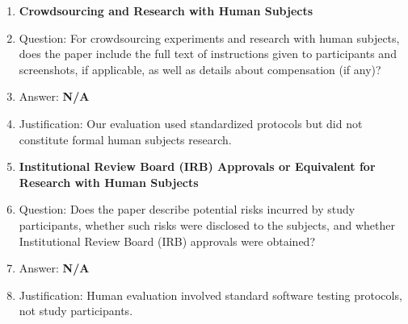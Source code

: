 \documentclass{article}
\begin{document}
\begin{enumerate}
\item {\bf Crowdsourcing and Research with Human Subjects}
    \item[] Question: For crowdsourcing experiments and research with human subjects, does the paper include the full text of instructions given to participants and screenshots, if applicable, as well as details about compensation (if any)?
    \item[] Answer: \textbf{N/A}
    \item[] Justification: Our evaluation used standardized protocols but did not constitute formal human subjects research.

\item {\bf Institutional Review Board (IRB) Approvals or Equivalent for Research with Human Subjects}
    \item[] Question: Does the paper describe potential risks incurred by study participants, whether such risks were disclosed to the subjects, and whether Institutional Review Board (IRB) approvals were obtained?
    \item[] Answer: \textbf{N/A}
    \item[] Justification: Human evaluation involved standard software testing protocols, not study participants.

\end{enumerate}
\end{document}
